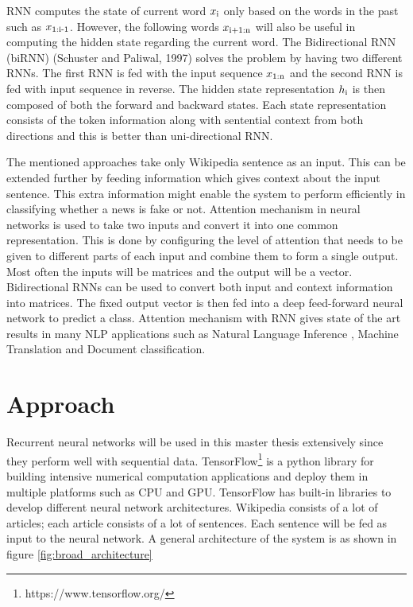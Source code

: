 \documentclass[a4paper, 11pt]{article}
\begin{document}
RNN computes the state of current word $x\textsubscript{i}$ only based on the words in the past such as $x\textsubscript{1:i-1}$. However, the following words $x\textsubscript{i+1:n}$ will also be useful in computing the hidden state regarding the current word. The Bidirectional RNN (biRNN) (Schuster and Paliwal, 1997) solves the problem by having two different RNNs. The first RNN is fed with the input sequence $x\textsubscript{1:n}$ and the second RNN is fed with input sequence in reverse. The hidden state representation $h\textsubscript{i}$ is then composed of both the forward and backward states. Each state representation consists of the token information along with sentential context from both directions and this is better than uni-directional RNN.

The mentioned approaches take only Wikipedia sentence as an input. This can be extended further by feeding information which gives context about the input sentence. This extra information might enable the system to perform efficiently in classifying whether a news is fake or not. Attention mechanism in neural networks is used to take two inputs and convert it into one common representation. This is done by configuring the level of attention that needs to be given to different parts of each input and combine them to form a single output. Most often the inputs will be matrices and the output will be a vector. Bidirectional RNNs can be used to convert both input and context information into matrices. The fixed output vector is then fed into a deep feed-forward neural network to predict a class. Attention mechanism with RNN gives state of the art results in many NLP applications such as Natural Language Inference \cite{Parikh2016}, Machine Translation\cite{Bahdanau2014} and Document classification\cite{Yang2016}.

\section{Approach}  
Recurrent neural networks will be used in this master thesis extensively since they perform well with sequential data. TensorFlow\footnote{https://www.tensorflow.org/} is a python library for building intensive numerical computation applications and deploy them in multiple platforms such as CPU and GPU. TensorFlow has built-in libraries to develop different neural network architectures. Wikipedia consists of a lot of articles; each article consists of a lot of sentences. Each sentence will be fed as input to the neural network. A general architecture of the system is as shown in figure \ref{fig:broad_architecture}
\end{document}
